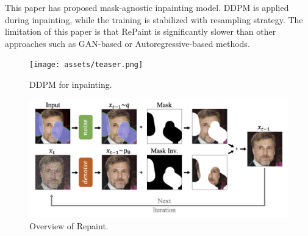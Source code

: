 \documentclass[10pt,twocolumn,letterpaper]{article}
\begin{document}
This paper has proposed mask-agnostic inpainting model.
DDPM is applied during inpainting, while the training is stabilized with resampling strategy.
The limitation of this paper is that RePaint is significantly slower than other approaches such as GAN-based or Autoregressive-based methods.


\begin{figure}[t]
    \texttt{[image: assets/teaser.png]}
    \caption{\label{fig:teaser}DDPM for inpainting.}
\end{figure}

\begin{figure}[t]
    \includegraphics[width=\linewidth]{assets/overview.png}
    \caption{\label{fig:overview}Overview of Repaint.}
\end{figure}




{\small


}
\end{document}
